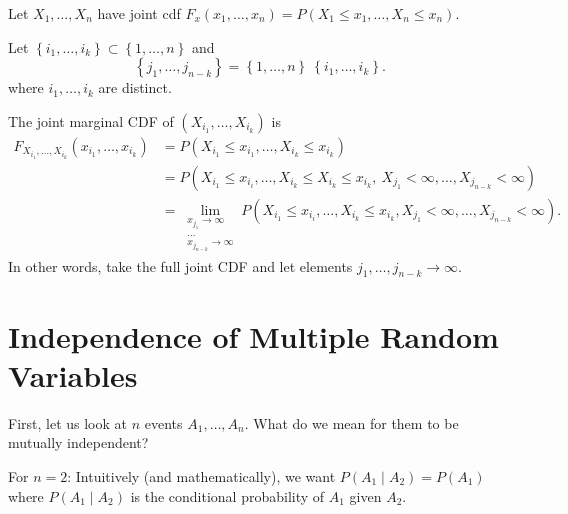
\begin{definition}
	Let $X_1, \ldots, X_{n}$ have joint cdf $F_{x}\left( x_1, \ldots, x_{n} \right)  = P \left( X_{1} \le x_1, \ldots, X_{n}\le x_{n} \right) $. 

	Let $\left\{ i_1, \ldots, i_{k} \right\} \subset \left\{ 1,\ldots,n \right\} $ and 
	\[
	\left\{ j_1, \ldots, j_{n-k} \right\} = \left\{ 1, \ldots, n \right\} \ \left\{ i_1, \ldots, i_{k} \right\} 
	.\] 
	where $i_1, \ldots, i_{k}$ are distinct. 

	The joint marginal CDF of  $\left( X_{i_1} ,\ldots, X_{i_{k}} \right) $ is 
	\begin{align*}
		F_{X_{i_1}, \ldots, X_{i_{k}}}\left( x_{i_{1}}, \ldots, x_{i_{k}} \right) 
		&= P\left( X_{i_{1}} \le  x_{i_{1}}, \ldots, X_{i_{k}} \le  x _{i_{k}} \right) \\ 
		&= P\left( X_{i_{1}} \le  x_{i_{i}} ,\ldots, X_{i_{k}} \le X_{i_{k}} \le x_{i_{k}}, \
		X_{j_{1}} < \infty, \ldots, X _{j_{n-k}} < \infty \right)  \\
		&=  \lim_{\substack{x_{j_{1}} \to \infty\\ \ldots \\ x_{j_{n - k}} \to \infty}} P\left( X_{i_{1}} \le  x_{i_{i}} ,\ldots, X_{i_{k}} \le x_{i_{k}},
		X_{j_{1}} < \infty, \ldots, X _{j_{n-k}} < \infty \right) 
	.\end{align*}
	In other words, take the full joint CDF and let elements $j_1, \ldots, j_{n - k} \to \infty$. 
	\end{definition}

\section{Independence of Multiple Random Variables}

First, let us look at $n$ events $A_1, \ldots, A_{n}$. What do we mean for them to be mutually independent?

For $n = 2$: Intuitively (and mathematically), we want $P\left( A_1  \mid A_2\right) = P\left( A_1 \right) $ where $P\left( A_1 \mid A_2 \right) $ is the conditional probability of $A_1$ given $A_2$. 


